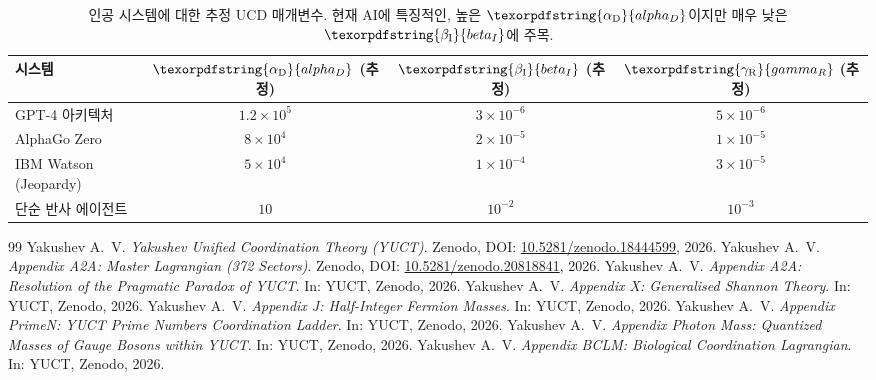 \documentclass[11pt,a4paper]{article}
\DeclareRobustCommand{\alD}{\texorpdfstring{\ensuremath{\alpha_{\mathrm{D}}}}{alpha_D}}
\DeclareRobustCommand{\beI}{\texorpdfstring{\ensuremath{\beta_{\mathrm{I}}}}{beta_I}}
\DeclareRobustCommand{\gaR}{\texorpdfstring{\ensuremath{\gamma_{\mathrm{R}}}}{gamma_R}}
\begin{document}
	\begin{table}[ht]
		\centering
		\begin{tabular}{lccc}
			\toprule
			\textbf{시스템} & \(\alD\) (추정) & \(\beI\) (추정) & \(\gaR\) (추정) \\
			\midrule
			GPT-4 아키텍처 & \(1.2 \times 10^5\) & \(3 \times 10^{-6}\) & \(5 \times 10^{-6}\) \\
			AlphaGo Zero & \(8 \times 10^4\) & \(2 \times 10^{-5}\) & \(1 \times 10^{-5}\) \\
			IBM Watson (Jeopardy) & \(5 \times 10^4\) & \(1 \times 10^{-4}\) & \(3 \times 10^{-5}\) \\
			단순 반사 에이전트 & \(10\) & \(10^{-2}\) & \(10^{-3}\) \\
			\bottomrule
		\end{tabular}
		\caption{인공 시스템에 대한 추정 UCD 매개변수. 현재 AI에 특징적인, 높은 \(\alD\)이지만 매우 낮은 \(\beI\)에 주목.}
		\label{tab:ai-measurements}
	\end{table}
	
	\begin{thebibliography}{99}
		Yakushev A.~V. \emph{Yakushev Unified Coordination Theory (YUCT)}. Zenodo, DOI: \href{https://doi.org/10.5281/zenodo.18444599}{10.5281/zenodo.18444599}, 2026.
		Yakushev A.~V. \emph{Appendix A2A: Master Lagrangian (372 Sectors)}. Zenodo, DOI: \href{https://doi.org/10.5281/zenodo.20818841}{10.5281/zenodo.20818841}, 2026.
		Yakushev A.~V. \emph{Appendix A2A: Resolution of the Pragmatic Paradox of YUCT}. In: YUCT, Zenodo, 2026.
		Yakushev A.~V. \emph{Appendix X: Generalised Shannon Theory}. In: YUCT, Zenodo, 2026.
		Yakushev A.~V. \emph{Appendix J: Half-Integer Fermion Masses}. In: YUCT, Zenodo, 2026.
		Yakushev A.~V. \emph{Appendix PrimeN: YUCT Prime Numbers Coordination Ladder}. In: YUCT, Zenodo, 2026.
		Yakushev A.~V. \emph{Appendix Photon Mass: Quantized Masses of Gauge Bosons within YUCT}. In: YUCT, Zenodo, 2026.
		Yakushev A.~V. \emph{Appendix BCLM: Biological Coordination Lagrangian}. In: YUCT, Zenodo, 2026.
	\end{thebibliography}
	
\end{document}
